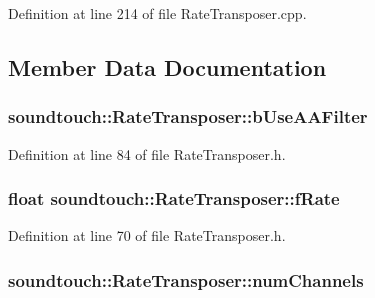 Definition at line 214 of file Rate\+Transposer.\+cpp.



\subsection{Member Data Documentation}
\subsubsection[{\texorpdfstring{b\+Use\+A\+A\+Filter}{bUseAAFilter}}]{ soundtouch\+::\+Rate\+Transposer\+::b\+Use\+A\+A\+Filter\hspace{0.3cm}{\ttfamily [protected]}}\hypertarget{classsoundtouch_1_1_rate_transposer_a6e05f37aa568e826701f62446991b77c}{}\label{classsoundtouch_1_1_rate_transposer_a6e05f37aa568e826701f62446991b77c}


Definition at line 84 of file Rate\+Transposer.\+h.

\subsubsection[{\texorpdfstring{f\+Rate}{fRate}}]{\setlength{\rightskip}{0pt plus 5cm}float soundtouch\+::\+Rate\+Transposer\+::f\+Rate\hspace{0.3cm}{\ttfamily [protected]}}\hypertarget{classsoundtouch_1_1_rate_transposer_a2b5aee8fbcdae3837d24f35be20e8480}{}\label{classsoundtouch_1_1_rate_transposer_a2b5aee8fbcdae3837d24f35be20e8480}


Definition at line 70 of file Rate\+Transposer.\+h.

\subsubsection[{\texorpdfstring{num\+Channels}{numChannels}}]{ soundtouch\+::\+Rate\+Transposer\+::num\+Channels\hspace{0.3cm}{\ttfamily [protected]}}\hypertarget{classsoundtouch_1_1_rate_transposer_a0e63f2c449394d144c19cee498489379}{}\label{classsoundtouch_1_1_rate_transposer_a0e63f2c449394d144c19cee498489379}


